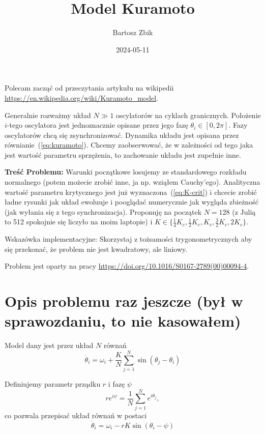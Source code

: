 \documentclass[12pt]{article}
\title{Model Kuramoto}
\author{Bartosz Zbik}
\date{2024-05-11} %
\begin{document}
\maketitle %

Polecam zacząć od przeczytania artykułu na wikipedii \url{https://en.wikipedia.org/wiki/Kuramoto_model}.


Generalnie rozważmy układ $N \gg 1$ oscylatorów na cyklach granicznych. Położenie $i$-tego oscylatora jest
jednoznacznie opisane przez jego fazę $\theta_i \in [0,2\pi]$. Fazy oscylatorów chcą się zsynchronizować.
Dynamika układu jest opisana przez równianie~(\ref{eq:kuramoto}).
Chcemy zaobserwować, że w zależności od tego jaka jest wartość parametru sprzężenia, to zachowanie układu jest zupełnie inne.

\textbf{Treść Problemu:} Warunki początkowe losujemy ze standardowego rozkładu normalnego (potem możecie zrobić inne, ja np. wziąłem Cauchy'ego).
Analityczna wartość parametru krytycznego jest już wyznaczona~(\ref{eq:K-crit}) i chcecie zrobić ładne rysunki jak układ ewoluuje i pooglądać numerycznie jak wygląda zbieżność (jak wyłania się z tego synchronizacja).
Proponuję na początek $N = 128$ (z Julią to 512 spokojnie się liczyło na moim laptopie) i $K \in \{\frac{1}{4}K_c, \frac{1}{2}K_c, K_c, \frac{3}{2}K_c, 2K_c \}$.

Wskazówka implementacyjne: Skorzystaj z tożsamości trygonometrycznych aby się przekonać, że problem nie jest kwadratowy, ale liniowy.

Problem jest oparty na pracy \url{https://doi.org/10.1016/S0167-2789(00)00094-4}.


\section{Opis problemu raz jeszcze (był w sprawozdaniu, to nie kasowałem)}
Model dany jest przez układ $N$ równań
\begin{equation}
\label{eq:kuramoto}
\dot \theta_i = \omega_i + \frac{K}{N} \sum_{j=1}^N \sin (\theta_j - \theta_i)
\end{equation}

Definiujemy parametr prządku $r$ i fazę $\psi$
\begin{equation}
r e^{i\psi} = \frac{1}{N} \sum_{j=1}^N e^{i\theta_j},
\end{equation}
co pozwala przepisać układ równań w postaci
\begin{equation}
\label{eq:nice-model}
\dot \theta_i = \omega_i - r K \sin (\theta_i - \psi)
\end{equation}
\end{document}
